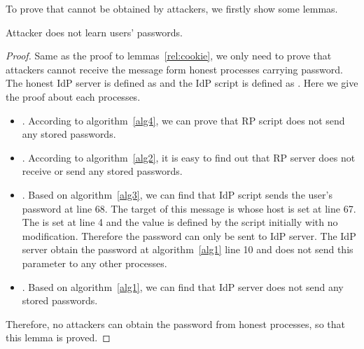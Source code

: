 \begin{appendices}
To prove that  cannot be obtained by attackers, we firstly show some lemmas.
\begin{relemma}
Attacker does not learn users' passwords.
\label{rel:password}
\end{relemma}
\begin{proof}
Same as the proof to lemmas~\ref{rel:cookie}, we only need to prove that attackers cannot receive the message form honest processes carrying password. The honest IdP server is defined as  and the IdP script is defined as . Here we give the proof about each processes.
\begin{itemize}
\item {}. According to algorithm~\ref{alg4}, we can prove that RP script does not send any stored passwords.
\item {}. According to algorithm~\ref{alg2}, it is easy to find out that RP server does not receive or send any stored passwords.
\item {}. Based on algorithm~\ref{alg3}, we can find that IdP script sends the user's password at line 68. The target of this message is  whose host is set at line 67. The  is set at line 4 and the value is defined  by the script initially with no modification. Therefore the password can only be sent to IdP server. The IdP server obtain the password at algorithm~\ref{alg1} line 10 and does not send this parameter to any other processes. 
\item {}. Based on algorithm~\ref{alg1},  we can find that IdP server does not send any stored passwords. 
\end{itemize}
Therefore, no attackers can obtain the password from honest processes, so that this lemma is proved.
\end{proof}


\end{appendices}
